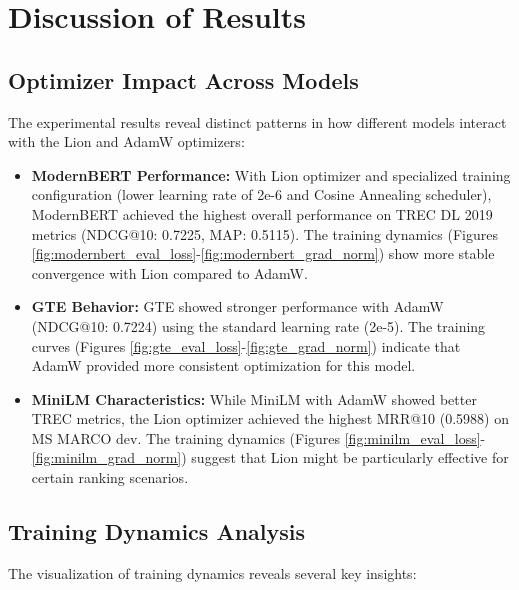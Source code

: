 \section{Discussion of Results}

\subsection{Optimizer Impact Across Models}

The experimental results reveal distinct patterns in how different models interact with the Lion and AdamW optimizers:

\begin{itemize}
    \item \textbf{ModernBERT Performance:} With Lion optimizer and specialized training configuration (lower learning rate of 2e-6 and Cosine Annealing scheduler), ModernBERT achieved the highest overall performance on TREC DL 2019 metrics (NDCG@10: 0.7225, MAP: 0.5115). The training dynamics (Figures \ref{fig:modernbert_eval_loss}-\ref{fig:modernbert_grad_norm}) show more stable convergence with Lion compared to AdamW.
    
    \item \textbf{GTE Behavior:} GTE showed stronger performance with AdamW (NDCG@10: 0.7224) using the standard learning rate (2e-5). The training curves (Figures \ref{fig:gte_eval_loss}-\ref{fig:gte_grad_norm}) indicate that AdamW provided more consistent optimization for this model.
    
    \item \textbf{MiniLM Characteristics:} While MiniLM with AdamW showed better TREC metrics, the Lion optimizer achieved the highest MRR@10 (0.5988) on MS MARCO dev. The training dynamics (Figures \ref{fig:minilm_eval_loss}-\ref{fig:minilm_grad_norm}) suggest that Lion might be particularly effective for certain ranking scenarios.
\end{itemize}

\subsection{Training Dynamics Analysis}

The visualization of training dynamics reveals several key insights:

